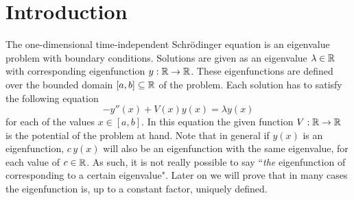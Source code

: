 

\label{cha:c2}


\section{Introduction}

The one-dimensional time-independent Schrödinger equation is an eigenvalue problem with boundary conditions. Solutions are given as an eigenvalue $\lambda \in \mathbb{R}$ with corresponding eigenfunction $y: \mathbb{R} \to \mathbb{R}$. These eigenfunctions are defined over the bounded domain $[a, b] \subseteq \mathbb{R}$ of the problem. Each solution has to satisfy the following equation
$$
    -y''(x) + V(x)y(x) = \lambda y(x)
$$
for each of the values $x\in [a, b]$. In this equation the given function $V: \mathbb{R} \to \mathbb{R}$ is the potential of the problem at hand. Note that in general if $y(x)$ is an eigenfunction, $c\,y(x)$ will also be an eigenfunction with the same eigenvalue, for each value of $c \in \mathbb{R}$. As such, it is not really possible to say ``\emph{the} eigenfunction of corresponding to a certain eigenvalue". Later on we will prove that in many cases the eigenfunction is, up to a constant factor, uniquely defined.

